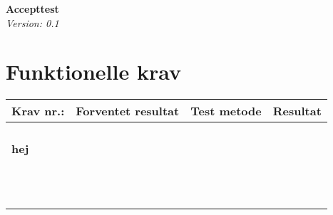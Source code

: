 \documentclass[11pt]{article}
\begin{document}
	\begin{titlepage}
		\begin{center}
			\Large\textbf{Accepttest}\\
			\large\textit{Version: 0.1}
		\end{center}
	\end{titlepage}
	
	\tableofcontents
	\newpage
	
	\section{Funktionelle krav}
	
		\begin{center}
			\begin{tabular}{ | m{3cm} | m{3cm}| m{3cm}| m{3cm}| }
			\hline
			Krav nr.: & Forventet resultat & Test metode & Resultat  \\
			\hline
			\paragraph{hej}  &  &  &   \\
			\hline
			&  &  &  \\
			\hline
			&  &  &  \\
			\hline
			&  &  &   \\
			\hline
			&  &  &  \\
			\hline
			&  &  &  \\
			\hline
			&  &  &   \\
			\hline
			&  &  &  \\
			\hline
			&  &  &  \\
			\hline
		\end{tabular}
		\end{center}

	
	
\end{document}
